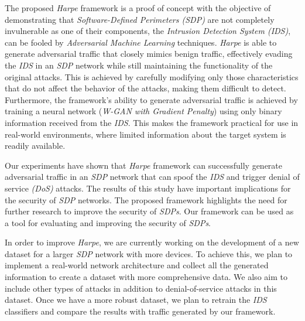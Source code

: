 The proposed \textit{Harpe} framework is a proof of concept with the objective of demonstrating that
\textit{Software-Defined Perimeters (SDP)} are not completely invulnerable as one of their components, the
\textit{Intrusion Detection System (IDS)}, can be fooled by \textit{Adversarial Machine Learning} techniques.
\textit{Harpe} is able to generate adversarial traffic that closely mimics benign traffic, effectively evading the
\textit{IDS} in an \textit{SDP} network while still maintaining the functionality of the original attacks.
This is achieved by carefully modifying only those characteristics that do not affect the behavior of the attacks,
making them difficult to detect.
Furthermore, the framework's ability to generate adversarial traffic is achieved by training a neural network
(\textit{W-GAN with Gradient Penalty}) using only binary information received from the \textit{IDS}.
This makes the framework practical for use in real-world environments, where limited information about the target
system is readily available.

Our experiments have shown that \textit{Harpe} framework can successfully generate adversarial traffic in an
\textit{SDP} network that can spoof the \textit{IDS} and trigger denial of service \textit{(DoS)} attacks.
The results of this study have important implications for the security of \textit{SDP} networks.
The proposed framework highlights the need for further research to improve the security of \textit{SDPs}.
Our framework can be used as a tool for evaluating and improving the security of \textit{SDPs}.

In order to improve \textit{Harpe}, we are currently working on the development of a new dataset for a larger
\textit{SDP} network with more devices.
To achieve this, we plan to implement a real-world network architecture and collect all the generated information to
create a dataset with more comprehensive data.
We also aim to include other types of attacks in addition to denial-of-service attacks in this dataset.
Once we have a more robust dataset, we plan to retrain the \textit{IDS} classifiers and compare the results with
traffic generated by our framework.
